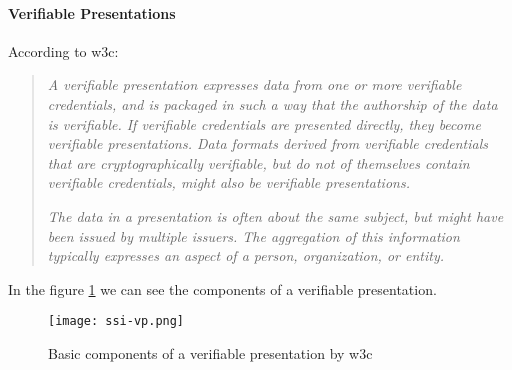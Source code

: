                 \paragraph{Verifiable Presentations}
                    According to \acrshort{w3c}\cite{w3c-vc}:
                    \begin{quote}
                        \textit{A verifiable presentation expresses data from one or more verifiable credentials, and is packaged in such a way that the authorship of the data is verifiable. If verifiable credentials are presented directly, they become verifiable presentations. Data formats derived from verifiable credentials that are cryptographically verifiable, but do not of themselves contain verifiable credentials, might also be verifiable presentations.}
                        
                        \textit{The data in a presentation is often about the same subject, but might have been issued by multiple issuers. The aggregation of this information typically expresses an aspect of a person, organization, or entity.}
                    \end{quote}
                    In the figure \ref{fig:ssi-vp} we can see the components of a verifiable presentation.
                    \begin{figure}[ht] 
                        \centering
                        \texttt{[image: ssi-vp.png]}
                        \caption{Basic components of a verifiable presentation by \acrshort{w3c}}
                        \label{fig:ssi-vp}
                    \end{figure}
